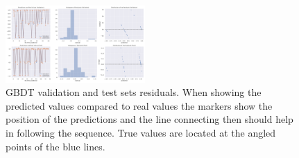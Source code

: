\begin{table}[htbp]
\centering
{}
\caption{Summary of the predictions on the test set for the different
algorithms. We present the MSE, the Mean Absolute Error (MAE) and the
$R^2$ score. The confidence intervals of the MSE are present only for linear
models since they rely on statistical assumptions on the distribution of the
residuals (they are normally distributed).}
\label{tab:ml:test}
\end{table}

\begin{figure}[htbp]
  \centering
  \includegraphics[width=0.475\textwidth]{img/grd_bst}
  \caption{GBDT validation and test sets residuals.
  When showing the predicted values compared to real values the markers show
  the position of the predictions and the line connecting then should help in
  following the sequence.
  True values are located at the angled points of the blue lines.}
  \label{fig:ml:gbdt}
\end{figure}

